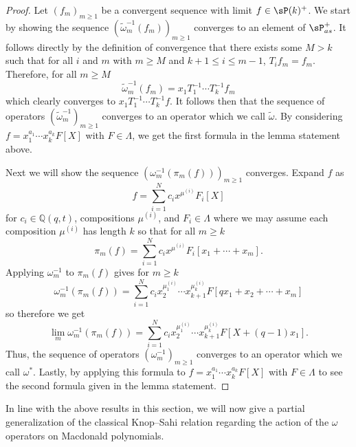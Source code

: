 \begin{proof}
    Let $(f_m)_{m\geq 1}$ be a convergent sequence with limit $f \in \sP(k)^{+}$. We start by showing the sequence $(\widetilde{\omega}_m^{-1}(f_m))_{m \geq 1}$ converges to an element of $\sP_{as}^{+}$. It follows directly by the definition of convergence that there exists some $M >k$ such that for all $i$ and $m$ with $m \geq M$ and $k+1 \leq i \leq m-1$, $T_if_m = f_m$. Therefore, for all $m \geq M$ 
    $$\widetilde{\omega}_m^{-1}(f_m) = x_1T_1^{-1}\cdots T_{k}^{-1}f_m $$ 
    which clearly converges to $x_1T_1^{-1}\cdots T_{k}^{-1}f$. It follows then that the sequence of operators $(\widetilde{\omega}_m^{-1})_{m\geq 1}$ converges to an operator which we call $\widetilde{\omega}.$ By considering $f = x_1^{a_1}\cdots x_k^{a_k}F[X]$ with $F \in \Lambda$, we get the first formula 
    in the lemma statement above.

    Next we will show the sequence $(\omega^{-1}_m(\pi_m(f)))_{m \geq 1}$ converges.
    Expand $f$ as
    $$f = \sum_{i=1}^{N} c_ix^{\mu^{(i)}}F_i[X]$$
    for $c_i \in \mathbb{Q}(q,t)$, compositions $\mu^{(i)}$, and $F_i \in \Lambda$ where we may assume each composition $\mu^{(i)}$ has length $k$ so that for all $m \geq k$ 
    $$ \pi_m(f) = \sum_{i=1}^{N} c_i x^{\mu^{(i)}} F_i[x_1+\cdots + x_m].$$
    Applying $\omega_{m}^{-1}$ to $\pi_m(f)$ gives for $m \geq k$ 
    $$\omega_{m}^{-1}(\pi_m(f)) = \sum_{i=1}^{N} c_i x_2^{\mu^{(i)}_1}\cdots x_{k+1}^{\mu^{(i)}_k}F[qx_1+x_2+\cdots + x_m] $$
    so therefore we get 
    $$\lim_{m} \omega_{m}^{-1}(\pi_m(f)) = \sum_{i=1}^{N} c_i x_2^{\mu^{(i)}_1}\cdots x_{k+1}^{\mu^{(i)}_k}F[X+(q-1)x_1].$$
    Thus, the sequence of operators $(\omega_{m}^{-1})_{m \geq 1}$ converges to an operator which we call $\omega^{*}$. Lastly, by applying this formula to $f = x_1^{a_1}\cdots x_k^{a_k}F[X]$ with $F \in \Lambda$ to see the second formula given in the lemma statement.
\end{proof}

In line with the above results in this section, we will now give a partial generalization of the classical Knop--Sahi relation regarding the action of the $\omega$ operators on Macdonald polynomials.  

